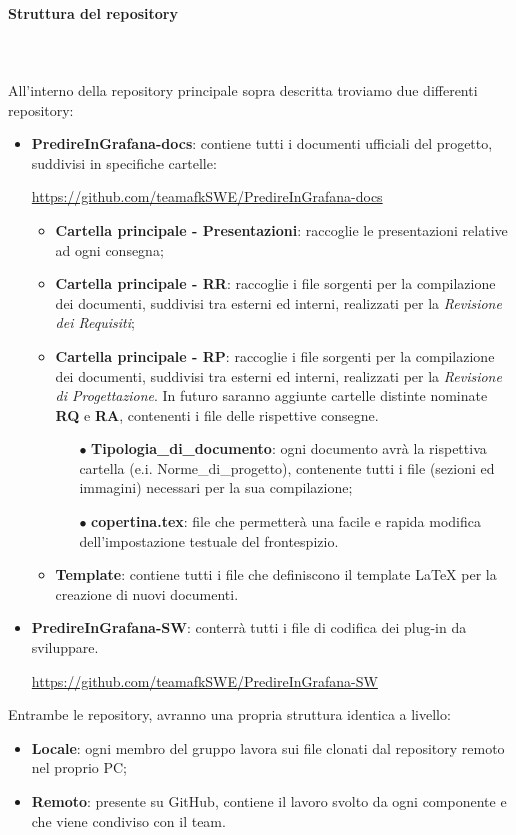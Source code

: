 \paragraph{Struttura del repository} \mbox{} \\ \mbox{} \\
All'interno della repository principale sopra descritta troviamo due differenti repository: \begin{itemize}
\item \textbf{PredireInGrafana-docs}: contiene tutti i documenti ufficiali del progetto, suddivisi in specifiche cartelle: \\
\centerline{\url{https://github.com/teamafkSWE/PredireInGrafana-docs}}  \begin{itemize}
\item \textbf{Cartella principale - Presentazioni}: raccoglie le presentazioni relative ad ogni consegna;
\item \textbf{Cartella principale - RR}: raccoglie i file sorgenti per la compilazione dei documenti, suddivisi tra esterni ed interni, realizzati per la \textit{Revisione dei Requisiti};
\item \textbf{Cartella principale - RP}: raccoglie i file sorgenti per la compilazione dei documenti, suddivisi tra esterni ed interni, realizzati per la \textit{Revisione di Progettazione}. In futuro saranno aggiunte cartelle distinte nominate \textbf{RQ} e \textbf{RA}, contenenti i file delle rispettive consegne.
\begin{itemize}
\item[$\bullet$] \textbf{Tipologia\_di\_documento}: ogni documento avrà la rispettiva cartella (e.i. Norme\_di\_progetto), contenente tutti i file (sezioni ed immagini) necessari per la sua compilazione;
\item[$\bullet$] \textbf{copertina.tex}: file che permetterà una facile e rapida modifica dell'impostazione testuale del frontespizio.
\end{itemize}
\item \textbf{Template}: contiene tutti i file che definiscono il template \LaTeX{} per la creazione di nuovi documenti.
\end{itemize} 
\item \textbf{PredireInGrafana-SW}: conterrà tutti i file di codifica dei plug-in da sviluppare. \\ \centerline{\url{https://github.com/teamafkSWE/PredireInGrafana-SW}}
\end{itemize}
Entrambe le repository, avranno una propria struttura identica a livello: \begin{itemize}
\item \textbf{Locale}: ogni membro del gruppo lavora sui file clonati dal repository remoto nel proprio PC;
\item \textbf{Remoto}: presente su GitHub, contiene il lavoro svolto da ogni componente e che viene condiviso con il team.
\end{itemize}

